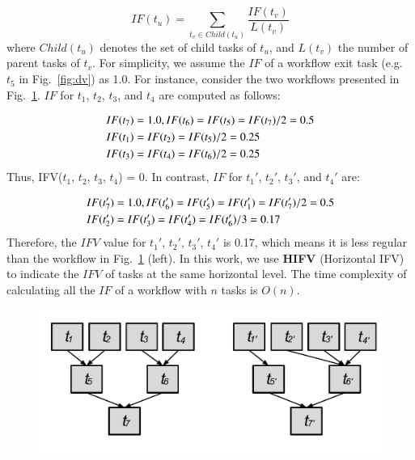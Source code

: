
\begin{equation}
	IF(t_u)=\sum_{t_v\in Child(t_u)}^{}\frac{IF(t_v)}{L(t_v)}
\end{equation}
where $Child(t_u)$ denotes the set of child tasks of $t_u$, and $L(t_v)$ the number of parent tasks of $t_v$. For simplicity, we assume the $IF$ of a workflow exit task (e.g. $t_5$ in Fig.~\ref{fig:dv}) as 1.0. For instance, consider the two workflows presented in Fig.~\ref{fig:hifv}. $IF$ for $t_1$, $t_2$, $t_3$, and $t_4$ are computed as follows:

\begin{eqnarray}
	\displaystyle  
	&IF(t_7 )=1.0, IF(t_6 )=IF(t_5 )=IF(t_7 )/2=0.5\nonumber  \\
	&IF(t_1 )=IF(t_2 )=IF(t_5 )/2=0.25\nonumber \\
	&IF(t_3 )=IF(t_4 )=IF(t_6 )/2=0.25\nonumber 
\end{eqnarray}
Thus, IFV($t_1$, $t_2$, $t_3$, $t_4$) = 0. In contrast, $IF$ for $t_1'$, $t_2'$, $t_3'$, and $t_4'$ are:

\begin{eqnarray}
	\displaystyle  
	&IF(t_7')=1.0, IF(t_6')=IF(t_5')=IF(t_1')=IF(t_7')/2=0.5\nonumber \\
	&IF(t_2')=IF(t_3')=IF(t_4')=IF(t_6')/3=0.17 \nonumber
\end{eqnarray}
Therefore, the $IFV$ value for {$t_1'$, $t_2'$, $t_3'$, $t_4'$} is 0.17, which means it is less regular than the workflow in Fig.~\ref{fig:hifv} (left). In this work, we use \textbf{HIFV} (Horizontal IFV) to indicate the $IFV$ of tasks at the same horizontal level. The time complexity of calculating all the $IF$ of a workflow with $n$ tasks is $O(n)$.  



\begin{figure}[htb]
	\centering
	\includegraphics[width=0.85\linewidth]{figure/hifv.pdf}
	\label{fig:hifv}
	\vspace{-10pt}
\end{figure}

